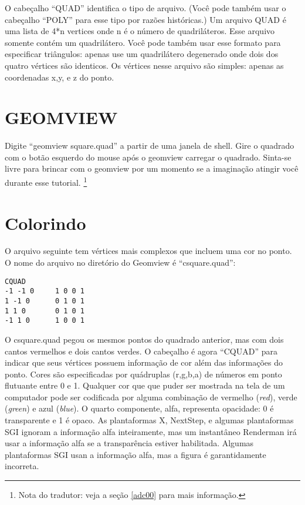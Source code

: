 \documentclass[12pt,a4paper]{book}
\begin{document}
O cabe\c{c}alho ``QUAD'' identifica o tipo de arquivo.  (Voc\^e pode tamb\'em usar o
cabe\c{c}alho ``POLY'' para esse tipo por raz\~oes hist\'{o}ricas.)  Um arquivo QUAD \'e uma
lista de 4*n vertices onde n \'e o n\'umero de quadril\'ateros. Esse
arquivo somente cont\'em um quadril\'atero.  Voc\^e pode tamb\'em usar esse formato para
especificar tri\^angulos: apenas use um quadril\'atero degenerado onde dois dos
quatro v\'ertices s\~ao identicos.  Os v\'ertices nesse arquivo s\~ao
simples: apenas as coordenadas x,y, e z do ponto.

\section{GEOMVIEW}

Digite ``geomview square.quad'' a partir de uma janela de shell.
Gire o quadrado com o bot\~ao esquerdo do mouse
ap\'{o}s o geomview carregar o quadrado. Sinta-se livre para brincar com o geomview por um momento se
a imagina\c{c}\~ao atingir voc\^e durante esse tutorial.
\footnote{Nota do tradutor: veja a se\c{c}\~ao \ref{adc00} para mais informa\c{c}\~ao.}

\section{Colorindo}

O arquivo seguinte tem v\'ertices mais complexos que incluem uma cor no ponto. 
O nome do arquivo no diret\'{o}rio do Geomview \'e ``csquare.quad'':

\begin{verbatim}
CQUAD
-1 -1 0		1 0 0 1
1 -1 0		0 1 0 1
1 1 0		0 1 0 1
-1 1 0		1 0 0 1
\end{verbatim}

O csquare.quad pegou os mesmos pontos do quadrado anterior, mas com dois cantos vermelhos e
dois cantos verdes. O cabe\c{c}alho \'e agora ``CQUAD'' para indicar que seus
v\'ertices possuem informa\c{c}\~ao de cor al\'em das informa\c{c}\~oes do ponto.
Cores s\~ao especificadas por qu\'adruplas (r,g,b,a) de n\'umeros em ponto flutuante
entre 0 e 1. Qualquer cor que que puder ser mostrada na tela de um computador
pode ser codificada por alguma combina\c{c}\~ao de vermelho (\textit{red}), verde (\textit{green}) e azul (\textit{blue}). O quarto
componente, alfa, representa opacidade: 0 \'e transparente e 1 \'e
opaco. As plantaformas X, NextStep, e algumas plantaformas SGI ignoram a informa\c{c}\~ao
alfa inteiramente, mas um instant\^aneo Renderman ir\'a usar a informa\c{c}\~ao
alfa se a transpar\^encia estiver habilitada. Algumas plantaformas SGI usan a
informa\c{c}\~ao alfa, mas a figura \'e garantidamente incorreta.
\end{document}
